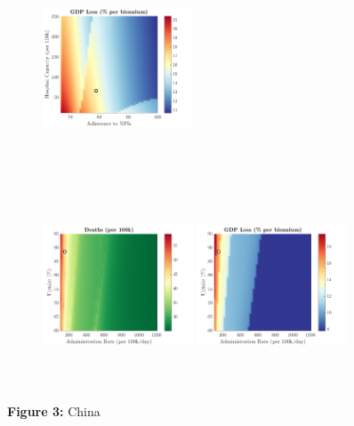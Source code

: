 \documentclass[paper=a4, fontsize=11pt]{scrartcl}
\numberwithin{figure}{section}
\numberwithin{table}{section}
\begin{document}
\begin{figure}[H]
\begin{subfigure}[b]{\textwidth}
	\hspace{0.05cm}
    	\includegraphics[width=0.49\textwidth,height=6cm]{CN/SARS/npl_g}
    \end{subfigure}
    \begin{subfigure}[b]{\textwidth}
      	\includegraphics[width=0.49\textwidth,height=6cm]{CN/SARS/imm_d}
	\hspace{0.05cm}
    	\includegraphics[width=0.49\textwidth,height=6cm]{CN/SARS/imm_g}
    \end{subfigure}
\caption*{\textbf{Figure 3:} China} 
\end{figure}
\end{document}
